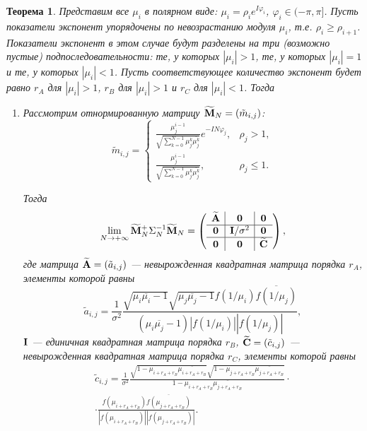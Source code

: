 \documentclass[12pt,a4paper]{article}
\newtheorem{theorem}{Теорема}
\begin{document}
\begin{theorem} \label{th:arinconsistency}
	Представим все $\mu_i$ в полярном виде: $\mu_i = \rho_i e^{I \varphi_i}$, $\varphi_i \in (-\pi, \pi]$. Пусть показатели экспонент упорядочены по невозрастанию модуля $\mu_i$, т.е. $\rho_i \ge \rho_{i+1}$. Показатели экспонент в этом случае будут разделены на три (возможно пустые) подпоследовательности: те, у которых $|\mu_i|>1$, те, у которых $|\mu_i| = 1$ и те, у которых $|\mu_i| < 1$. Пусть соответствующее количество экспонент будет равно $r_A$ для $|\mu_i|>1$, $r_B$ для $|\mu_i|>1$ и $r_C$ для $|\mu_i|<1$. Тогда
	\begin{enumerate}
		\item Рассмотрим отнормированную матрицу $\widetilde {\mathbf{M}}_N = (\tilde m_{i, j})$: 
		\begin{equation*}
		\tilde m_{i, j} = \begin{cases}
		\frac{\mu_j^{i-1}}{\sqrt{\sum_{k=0}^{N-1} \mu_j^k \overline{\mu_j^k}}} e^{-I N \varphi_j}, & \rho_j > 1, \\
		\frac{\mu_j^{i-1}}{\sqrt{\sum_{k=0}^{N-1} \mu_j^k \overline{\mu_j^k}}}, & \rho_j \le 1.
		\end{cases}
		\end{equation*}
		
		Тогда \begin{equation*}
		\lim_{N \to + \infty} \widetilde {\mathbf{M}}_N^+ \Sigma_N^{-1} \widetilde {\mathbf{M}}_N = \left( \begin{array}{c|c|c}
		\widetilde {\mathbf{A}} & \mathbf{0} & \mathbf{0} \\ \hline
		\mathbf{0} & \mathbf{I} / \sigma^2& \mathbf{0} \\ \hline
		\mathbf{0} & \mathbf{0} & \widetilde {\mathbf{C}}
		\end{array}  \right),
		\end{equation*}
		где матрица $\widetilde {\mathbf{A}} = (\tilde a_{i, j})$ --- невырожденная квадратная матрица порядка $r_A$, элементы которой равны
		\begin{equation*}
		\tilde a_{i, j} = \frac{1}{\sigma^2} \frac{\sqrt{\mu_i \overline{\mu_i} - 1}\sqrt{\mu_j \overline{\mu_j} - 1} f(1/\mu_i) \overline{f(1/\mu_j)} }{(\mu_i \overline{\mu_j} - 1) |f(1/\mu_i)| |f(1/\mu_j)|},
		\end{equation*}
		$\mathbf{I}$ --- единичная квадратная матрица порядка $r_B$, $\widetilde {\mathbf{C}} = (\tilde c_{i, j})$ --- невырожденная квадратная матрица порядка $r_C$, элементы которой равны
		\begin{multline*}
		\tilde c_{i, j} = \frac{1}{\sigma^2} \frac{\sqrt{1 - \mu_{i+r_A+r_B} \overline{\mu_{i+r_A+r_B}}}\sqrt{1 - \mu_{j+r_A+r_B} \overline{\mu_{j+r_A+r_B}}}}{1 - \mu_{i+r_A+r_B} \overline{\mu_{j+r_A+r_B}}} \cdot \\ \cdot \frac{f(\mu_{i+r_A+r_B}) \overline{f(\mu_{j+r_A+r_B})}}{|f(\mu_{i+r_A+r_B})| |f(\mu_{j+r_A+r_B})|}.
		\end{multline*}
		

\end{enumerate}
\end{theorem}
\end{document}
